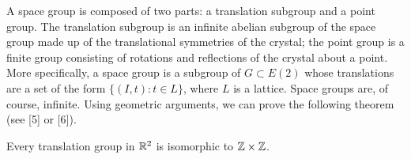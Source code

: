  
A space group is composed of two parts: a {\bfi translation
subgroup\/} and a {\bfi point
group}.  The translation subgroup is an infinite
abelian subgroup of the space group made up of the translational
symmetries of the crystal; the point group is a finite group 
consisting  of rotations and reflections of the crystal about a point.
More specifically, a space group is a subgroup of $G \subset E(2)$
whose translations are a set of the form $\{ (I, t) : t \in L \}$,
where $L$ is a lattice. Space groups are, of course, infinite. Using
geometric arguments, we can prove the following theorem (see [5] or [6]).
 
 
 
 
\begin{theorem}
Every translation group in ${\Bbb R}^2$ is isomorphic to ${\Bbb Z}
\times {\Bbb Z}$.
\end{theorem}
 

